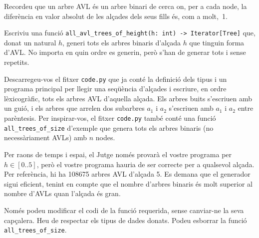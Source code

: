 

\Statement

Recordeu que un arbre AVL és un arbre binari de cerca on, per a cada node, la diferència en valor absolut de les alçades dels seus fills és, com a molt,~1.

\medskip

Escriviu una funció \lstinline|all_avl_trees_of_height(h: int) -> Iterator[Tree]| que, donat un natural $h$, generi tots els arbres binaris d'alçada $h$ que tinguin forma d'AVL. No importa en quin ordre es generin, però s'han de generar tots i sense repetits.

\medskip

Descarregeu-vos el fitxer \texttt{code.py} que ja conté la definició dels tipus i un programa principal per llegir una seqüència d'alçades i escriure, en ordre lèxicogràfic, tots els arbres AVL d'aquella alçada. Els arbres buits s'escriuen amb un guió, i els arbres que arrelen dos subarbres $a_1$ i $a_2$ s'escriuen amb $a_1$ i $a_2$ entre parèntesis. Per inspirar-vos, el fitxer \texttt{code.py} també conté una funció \lstinline|all_trees_of_size| d'exemple que genera tots els arbres binaris (no necessàriament AVLs) amb $n$ nodes.

\medskip
Per raons de temps i espai, el Jutge només provarà el vostre programa per $h\in[0..5]$, però el vostre programa hauria de ser correcte per a qualsevol alçada. Per referència, hi ha 108675 arbres AVL d'alçada 5. Es demana que el generador sigui eficient, tenint en compte que el nombre d'arbres binaris és molt superior al nombre d'AVLs quan l'alçada és gran.

\medskip

Només podeu modificar el codi de la funció requerida, sense canviar-ne la seva capçalera. Heu de respectar els tipus de dades donats. Podeu esborrar la funció \lstinline|all_trees_of_size|.

\Sample
